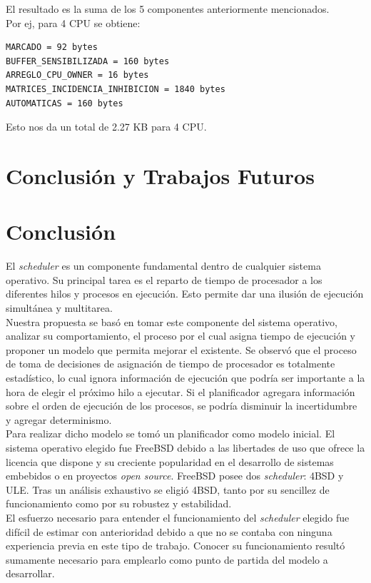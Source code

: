 \documentclass[a4paper]{book}
\begin{document}
El resultado es la suma de los 5 componentes anteriormente mencionados.\\

Por ej, para 4 CPU se obtiene:
\begin{verbatim}
MARCADO = 92 bytes
BUFFER_SENSIBILIZADA = 160 bytes
ARREGLO_CPU_OWNER = 16 bytes
MATRICES_INCIDENCIA_INHIBICION = 1840 bytes
AUTOMATICAS = 160 bytes
\end{verbatim}

Esto nos da un total de 2.27 KB para 4 CPU.

\section{Conclusi\'on y Trabajos Futuros}

\section{Conclusi\'on}

El \emph{scheduler} es un componente fundamental dentro de cualquier sistema operativo. Su principal tarea es el reparto de tiempo de procesador a los diferentes hilos y procesos en ejecución. Esto permite dar una ilusión de ejecución simultánea y multitarea.\\

Nuestra propuesta se basó en tomar este componente del sistema operativo, analizar su comportamiento, el proceso por el cual asigna tiempo de ejecución y proponer un modelo que permita mejorar el existente. Se observó que el proceso de toma de decisiones de asignación de tiempo de procesador es totalmente estadístico, lo cual ignora información de ejecución que podría ser importante a la hora de elegir el próximo hilo a ejecutar. Si el planificador agregara información sobre el orden de ejecución de los procesos, se podría disminuir la incertidumbre y agregar determinismo.\\

Para realizar dicho modelo se tomó un planificador como modelo inicial. El sistema operativo elegido fue FreeBSD debido a las libertades de uso que ofrece la licencia que dispone y su creciente popularidad en el desarrollo de sistemas embebidos o en proyectos \emph{open source}. FreeBSD posee dos \emph{scheduler}: 4BSD y ULE. Tras un análisis exhaustivo se eligió 4BSD, tanto por su sencillez de funcionamiento como por su robustez y estabilidad.\\

El esfuerzo necesario para entender el funcionamiento del \emph{scheduler} elegido fue difícil de estimar con anterioridad debido a que no se contaba con ninguna experiencia previa en este tipo de trabajo. Conocer su funcionamiento result\'o sumamente necesario para emplearlo como punto de partida del modelo a desarrollar.\\
\end{document}
